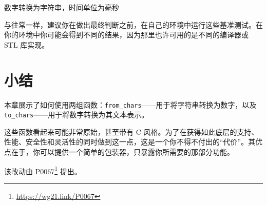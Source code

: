 数字转换为字符串，时间单位为毫秒


与往常一样，建议你在做出最终判断之前，在自己的环境中运行这些基准测试。在你的环境中你可能会得到不同的结果，因为那里也许可用的是不同的编译器或 STL 库实现。

\section{小结}

本章展示了如何使用两组函数：\texttt{from\_chars}——用于将字符串转换为数字，以及 \texttt{to\_chars}——用于将数字转换为其文本表示。

这些函数看起来可能非常原始，甚至带有 C 风格。为了在获得如此底层的支持、性能、安全性和灵活性的同时做到这一点，这是一个你不得不付出的“代价”。其优点在于，你可以提供一个简单的包装器，只暴露你所需要的那部分功能。

\begin{myInfoBox}
该改动由 P0067\footnote{\url{https://wg21.link/P0067}} 提出。
\end{myInfoBox}
